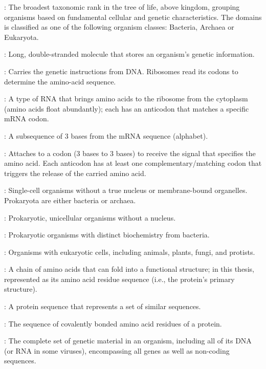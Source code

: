 \documentclass[a4paper,12pt]{extarticle}
\begin{document}
  \begin{description}[leftmargin=1.2em]
    \item[Domain \textnormal{or} Superkingdom]: The broadest taxonomic rank in the tree of life, above kingdom, grouping organisms based on fundamental cellular and genetic characteristics. The domains is classified as one of the following organism classes: Bacteria, Archaea or Eukaryota.
    \item[DNA]: Long, double-stranded molecule that stores an organism's genetic information.
    \item[mRNA]: Carries the genetic instructions from DNA. Ribosomes read its codons to determine the amino-acid sequence.
    \item[tRNA]: A type of RNA that brings amino acids to the ribosome from the cytoplasm (amino acids float abundantly); each has an anticodon that matches a specific mRNA codon.
    \item[Codon]: A subsequence of 3 bases from the mRNA sequence (alphabet).
    \item[Anticodon]: Attaches to a codon (3 bases to 3 bases) to receive the signal that specifies the amino acid. Each anticodon has at least one complementary/matching codon that triggers the release of the carried amino acid.
    \item[Prokaryota]: Single-cell organisms without a true nucleus or membrane-bound organelles. Prokaryota are either bacteria or archaea.
    \item[Bacteria]: Prokaryotic, unicellular organisms without a nucleus.
    \item[Archaea]: Prokaryotic organisms with distinct biochemistry from bacteria.
    \item[Eukaryota]: Organisms with eukaryotic cells, including animals, plants, fungi, and protists.
    \item[Protein (Sequence)]: A chain of amino acids that can fold into a functional structure; in this thesis, represented as its amino acid residue sequence (i.e., the protein's primary structure).
    \item[Reference Protein Sequence]: A protein sequence that represents a set of similar sequences.
    \item[Protein Primary Structure]: The sequence of covalently bonded amino acid residues of a protein.
    \item[Genome]: The complete set of genetic material in an organism, including all of its DNA (or RNA in some viruses), encompassing all genes as well as non-coding sequences.

\end{description}
\end{document}
